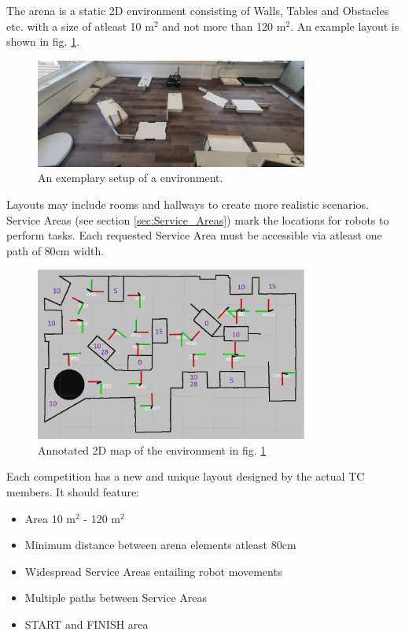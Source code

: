 The arena is a static 2D environment consisting of Walls, Tables and Obstacles etc. with a size of atleast 10 m$^2$ and not more than 120 m$^2$. 
An example layout is shown in fig. \ref{fig:arena_example}.

\begin{figure} [h!]
\centering
\includegraphics[width= 0.8\textwidth ]{./images/general_rules/arena_example.jpg}
\caption{An exemplary setup of a \RCAW environment.}
\label{fig:arena_example}
\end{figure}

Layouts may include rooms and hallways to create more realistic scenarios.
Service Areas (see section \ref{sec:Service_Areas}) mark the locations for robots to perform tasks.
Each requested Service Area must be accessible via atleast one path of $80\si{\centi\meter}$ width.

\begin{figure} [h!]
\centering
\includegraphics[width= 0.8\textwidth ]{./images/general_rules/arena_map_annotated}
\caption{Annotated 2D map of the environment in fig. \ref{fig:arena_example}}
\label{fig:arena_map_annotated}
\end{figure}

Each competition has a new and unique layout designed by the actual TC members.
It should feature:
\begin{itemize}
\item Area 10 m$^2$ - 120 m$^2$
\item Minimum distance between arena elements atleast $80\si{\centi\meter}$ 
\item Widespread Service Areas entailing robot movements
\item Multiple paths between Service Areas
\item START and FINISH area
\end{itemize}


